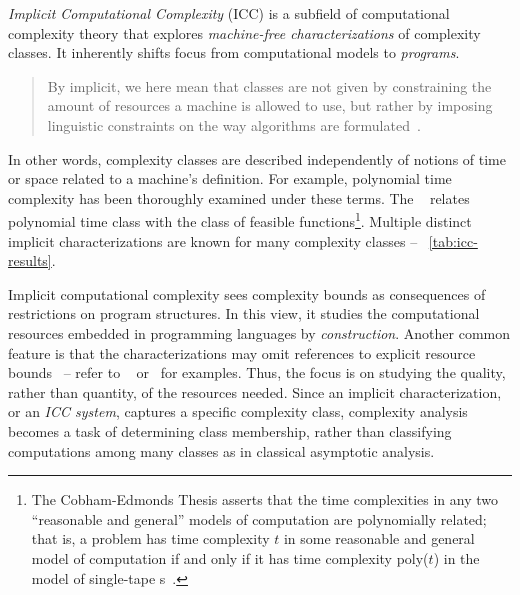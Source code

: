 \emph{Implicit Computational Complexity} (ICC) is a subfield of computational
complexity theory that explores \emph{machine-free
characterizations} of complexity classes. It
inherently shifts focus from computational models to
\emph{programs}.
\begin{quotation}
\noindent By implicit, we here mean that classes are not given by constraining
the amount of resources a machine is
allowed to use, but rather by imposing linguistic constraints on the way
algorithms are formulated~\cite[p. 90]{dallago2011}.
\end{quotation}
In other words, complexity classes are described
independently of notions of time or space related to a machine's definition. For
example, polynomial time complexity has been thoroughly examined under
these terms. The ~\cite{cobham1965,edmonds1965}
relates polynomial time class with the class of feasible functions\footnote{ The
Cobham-Edmonds Thesis asserts that the time complexities in any two
\enquote{reasonable and general} models of computation are polynomially related;
that is, a problem has time complexity \(t\) in some reasonable and general
model of computation if and only if it has time complexity poly(\(t\)) in the
model of single-tape s~\cite[p. 33]{goldreich2008}.}.
Multiple distinct implicit characterizations are known for many complexity
classes -- \cf~\autoref{tab:icc-results}.

Implicit computational complexity sees complexity bounds as consequences of
restrictions on program structures. In this view, it studies the computational
resources embedded in programming languages by \emph{construction}. Another
common feature is that the characterizations may omit references to explicit
resource bounds~\cite{moyen2017} -- refer to \eg~%
\textcite{bellantoni1992} or~\textcite{kristiansen2005} for examples. Thus, the
focus is on studying the quality, rather than quantity, of the resources needed.
Since an implicit characterization, or an \emph{ICC system}, captures a specific
complexity class, complexity analysis becomes a task
of determining class membership, rather than classifying computations among many
classes as in classical asymptotic analysis.

